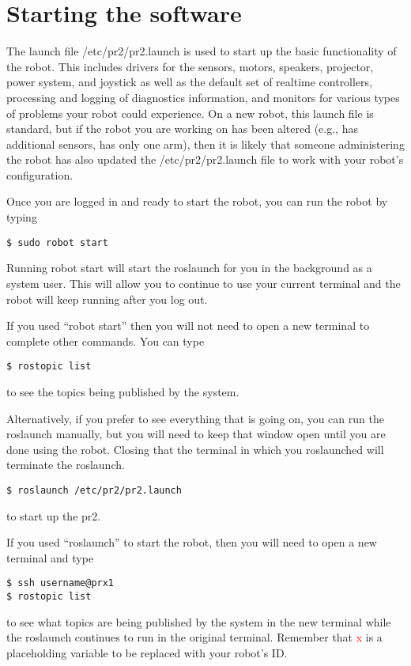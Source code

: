 \section{Starting the software}
The launch file /etc/pr2/pr2.launch is used to start up the basic functionality of the robot.  This includes drivers for 
the sensors, motors, speakers, projector, power system, and joystick as well as the default set of realtime controllers, 
processing and logging of diagnostics information, and monitors for various types of problems your robot could experience.  On a new robot, this launch file is standard, but if the robot you are working on has been altered (e.g., has additional sensors, has only one arm), then it is likely that someone administering the robot has also updated the /etc/pr2/pr2.launch file to work with your robot's configuration.

Once you are logged in and ready to start the robot, you can run the robot by typing
\begin{verbatim}
$ sudo robot start
\end{verbatim}
Running robot start will start the roslaunch for you in the background as a system user. This will 
allow you to continue to use your current terminal and the robot will keep running after you log out.  

If you used ``robot start'' then you will not need to open a new terminal to complete other commands. You can type 
\begin{verbatim}
$ rostopic list
\end{verbatim}
to see the topics being published by the system. 

Alternatively, if you prefer to see everything that is going on, you can run the roslaunch manually, but you will need to keep that 
window open until you are done using the robot. Closing that the terminal in which you roslaunched will terminate the 
roslaunch.
\begin{verbatim}
$ roslaunch /etc/pr2/pr2.launch
\end{verbatim}
to start up the pr2.  

If you used ``roslaunch'' to start the robot, then you will need to open a new terminal and type
\begin{verbatim}
$ ssh username@prx1
$ rostopic list
\end{verbatim}
to see what topics are being published by the system in the new terminal while the roslaunch continues to run in the 
original terminal. Remember that \textcolor{red}{x} is a placeholding variable to be replaced with your robot's ID.

